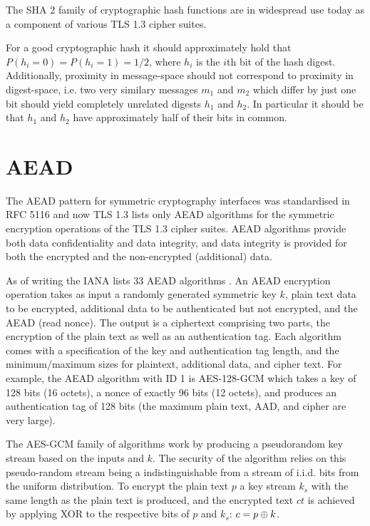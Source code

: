 The \ac{SHA} 2 family of cryptographic hash functions are in widespread use today as a component of various \ac{TLS} 1.3 cipher suites.



For a good cryptographic hash it should approximately hold that $P(h_i=0)=P(h_i=1)=1/2$, where $h_i$ is the $i$th bit of the hash digest.
Additionally, proximity in message-space should not correspond to proximity in digest-space, i.e. two very similary messages $m_1$ and $m_2$ which differ by just one bit should yield completely unrelated digests $h_1$ and $h_2$. In particular it should be that $h_1$ and $h_2$ have approximately half of their bits in common.

\section{AEAD}
The \ac{AEAD} pattern for symmetric cryptography interfaces was standardised in RFC 5116 \citep{rfc5116-aead} and now \ac{TLS} 1.3 lists only \ac{AEAD} algorithms for the symmetric encryption operations of the \ac{TLS} 1.3 cipher suites. \ac{AEAD} algorithms provide both data confidentiality and data integrity, and data integrity is provided for both the encrypted and the non-encrypted (additional) data.

As of writing the IANA lists 33 \ac{AEAD} algorithms \citep{iana-aead}. An \ac{AEAD} encryption operation takes as input a randomly generated symmetric key $k$, plain text data to be encrypted, additional data to be authenticated but not encrypted, and the \ac{AEAD} \nonce (read nonce).
The output is a ciphertext comprising two parts, the encryption of the plain text as well as an authentication tag. Each algorithm comes with a specification of the key and authentication tag length, and the minimum/maximum sizes for plaintext, additional data, and cipher text. For example, the AEAD algorithm with ID 1 is \ac{AES}-128-\ac{GCM} which takes a key of 128 bits (16 octets), a nonce of exactly 96 bits (12 octets), and produces an authentication tag of 128 bits (the maximum plain text, AAD, and cipher are very large).

The \ac{AES}-\ac{GCM} family of algorithms work by producing a pseudorandom key stream based on the inputs \nonce and $k$. The security of the algorithm relies on this pseudo-random stream being a indistinguishable from a stream of i.i.d. bits from the uniform distribution. To encrypt the plain text $p$ a key stream $k_s$ with the same length as the plain text is produced, and the encrypted text $ct$ is achieved by applying \ac{XOR} to the respective bits of $p$ and $k_s$: $c=p\oplus k$.

